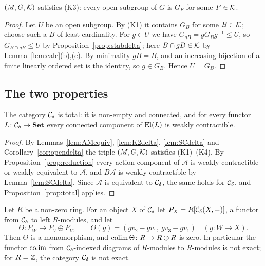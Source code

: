 \begin{corollary}\label{cor:opendelta}
$(M,G,\mathcal{K})$ satisfies \textup{(K3)}: every open subgroup of $G$ is $G_F$ for some
$F\in\mathcal{K}$.
\end{corollary}

\begin{proof}
Let $U$ be an open subgroup. By (K1) it contains $G_B$ for some $B\in\mathcal{K}$;
choose such a $B$ of least cardinality. For $g\in U$ we have
$G_{gB}=gG_Bg^{-1}\le U$, so $G_{B\cap gB}\le U$ by
Proposition~\ref{prop:stabdelta}; here $B\cap gB\in\mathcal{K}$ by
Lemma~\ref{lem:calc}(b),(c). By minimality $gB=B$, and an increasing bijection
of a finite linearly ordered set is the identity, so $g\in G_B$. Hence $U=G_B$.
\end{proof}

\subsection{The two properties}

\begin{theorem}\label{thm:total}
The category $\mathcal{C}_{\delta}$ is total: it is non-empty and connected, and for every
functor $L\colon\mathcal{C}_{\delta}\to\mathbf{Set}$ every connected component of $\operatorname{El}(L)$ is weakly
contractible.
\end{theorem}

\begin{proof}
By Lemmas~\ref{lem:AMequiv}, \ref{lem:K2delta}, \ref{lem:SCdelta} and
Corollary~\ref{cor:opendelta} the triple $(M,G,\mathcal{K})$ satisfies (K1)--(K4). By
Proposition~\ref{prop:reduction} every action component of $\mathcal A$ is
weakly contractible or weakly equivalent to $\mathcal A$, and $B\mathcal A$ is
weakly contractible by Lemma~\ref{lem:SCdelta}. Since $\mathcal A$ is equivalent
to $\mathcal{C}_{\delta}$, the same holds for $\mathcal{C}_{\delta}$, and Proposition~\ref{prop:total} applies.
\end{proof}

\begin{theorem}\label{thm:notexact}
Let $R$ be a non-zero ring. For an object $X$ of $\mathcal{C}_{\delta}$ let
$P_X=R[\mathcal{C}_{\delta}(X,-)]$, a functor from $\mathcal{C}_{\delta}$ to left $R$-modules, and let
\[
 \Theta\colon P_W\longrightarrow P_V\oplus P_V,\qquad
 \Theta(g)=(gv_2-gv_1,\ gv_3-gv_1)\quad(g\colon W\to X).
\]
Then $\Theta$ is a monomorphism, and $\operatorname{colim}\Theta\colon R\to R\oplus R$ is zero.
In particular the functor $\operatorname{colim}$ from $\mathcal{C}_{\delta}$-indexed diagrams of $R$-modules to
$R$-modules is not exact; for $R=\mathbb{Z}$, the category $\mathcal{C}_{\delta}$ is not exact.
\end{theorem}

